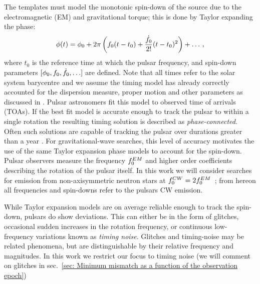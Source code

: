\documentclass[../full_thesis/full_thesis.tex]{subfiles}
\begin{document}
The templates must model the monotonic spin-down of the source due to the
electromagnetic (EM) and gravitational torque; this is done by Taylor expanding
the phase:
\begin{equation}
\phi(t) = \phi_{0} + 2\pi\left(f_{0} (t - t_{0}) +
          \frac{\dot{f}_{0}}{2!} (t - t_{0})^{2}
           \right)
           + \ldots
           \,,
\label{eqn: Taylor}
\end{equation}
where $t_{0}$ is the reference time at which the pulsar frequency, and
spin-down parameters $[\phi_{0}, f_{0}, \dot{f}_{0}, \ldots]$ are defined. Note
that all times refer to the solar system barycentre and we assume the
timing model has already correctly accounted for the dispersion measure, proper motion
and other parameters as discussed in \citet{Edwards2006}.
Pulsar astronomers fit this model to observed time of arrivals (TOAs). If the
best fit model is accurate enough to track the pulsar to within a single
rotation the resulting timing solution is described as \emph{phase-connected}.
Often such solutions are capable of tracking the pulsar over durations greater
than  a year \citep{Lyne2012book}.  For gravitational-wave searches, this level of accuracy
motivates the use of the same Taylor expansion phase models to account for the
spin-down.  Pulsar observers measure the frequency $f_{0}^{EM}$ and higher
order coefficients describing the rotation of the pulsar itself. In this
work we will consider searches for
emission from non-axisymmetric neutron stars at
$f_{0}^{CW}=2f_{0}^{EM}$~\citep{Shapiro83}; from hereon all frequencies
and spin-downs refer to the pulsars CW emission.

While Taylor expansion models are on average reliable enough to track the
spin-down, pulsars do show deviations. This can either be in the form of
glitches, occasional sudden increases in the rotation frequency, or
continuous low-frequency
variations known as \emph{timing noise}. Glitches and timing-noise may be
related phenomena, but are distinguishable by their relative frequency
and magnitudes. In this work we restrict our focus to timing noise (we will comment
        on glitches in sec.~\ref{sec: Minimum mismatch as a function of the observation epoch})
\end{document}
